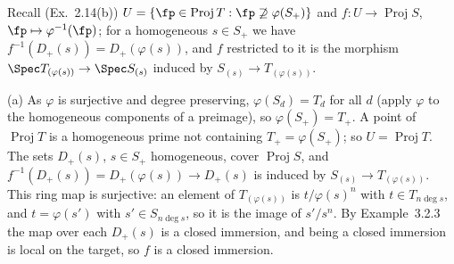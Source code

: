\documentclass[11pt]{article}
\begin{document}
\pf
Recall (Ex.~2.14(b)) $U=\{\fp\in\operatorname{Proj}T:\fp\not\supseteq\varphi(S_+)\}$ and $f:U\to\operatorname{Proj}S$, $\fp\mapsto\varphi^{-1}(\fp)$; for a homogeneous $s\in S_+$ we have $f^{-1}(D_+(s))=D_+(\varphi(s))$, and $f$ restricted to it is the morphism $\Spec T_{(\varphi(s))}\to\Spec S_{(s)}$ induced by $S_{(s)}\to T_{(\varphi(s))}$.

(a) As $\varphi$ is surjective and degree preserving, $\varphi(S_d)=T_d$ for all $d$ (apply $\varphi$ to the homogeneous components of a preimage), so $\varphi(S_+)=T_+$. A point of $\operatorname{Proj}T$ is a homogeneous prime not containing $T_+=\varphi(S_+)$; so $U=\operatorname{Proj}T$. The sets $D_+(s)$, $s\in S_+$ homogeneous, cover $\operatorname{Proj}S$, and $f^{-1}(D_+(s))=D_+(\varphi(s))\to D_+(s)$ is induced by $S_{(s)}\to T_{(\varphi(s))}$. This ring map is surjective: an element of $T_{(\varphi(s))}$ is $t/\varphi(s)^n$ with $t\in T_{n\deg s}$, and $t=\varphi(s')$ with $s'\in S_{n\deg s}$, so it is the image of $s'/s^n$. By Example~3.2.3 the map over each $D_+(s)$ is a closed immersion, and being a closed immersion is local on the target, so $f$ is a closed immersion.
\end{document}
